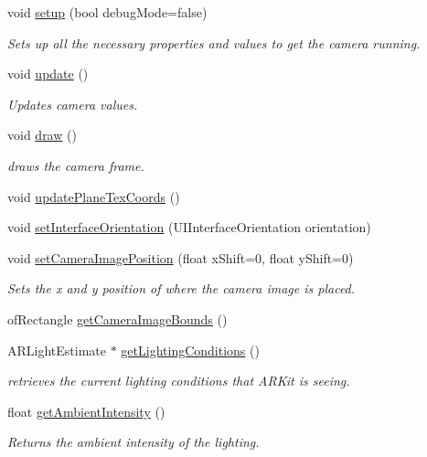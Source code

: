 \begin{DoxyCompactItemize}
void \hyperlink{class_a_r_core_1_1_a_r_cam_a5abe4cdd0ae36986899afaeae16c6bf2}{setup} (bool debug\+Mode=false)
\begin{DoxyCompactList}\small\item\em Sets up all the necessary properties and values to get the camera running. \end{DoxyCompactList}\item 
void \hyperlink{class_a_r_core_1_1_a_r_cam_a900296e2ff23dfa7deb8bfab58fd0729}{update} ()
\begin{DoxyCompactList}\small\item\em Updates camera values. \end{DoxyCompactList}\item 
void \hyperlink{class_a_r_core_1_1_a_r_cam_ac6506992ee88e0acd20d851849ebfa18}{draw} ()
\begin{DoxyCompactList}\small\item\em draws the camera frame. \end{DoxyCompactList}\item 
void \hyperlink{class_a_r_core_1_1_a_r_cam_a577095ff1d35c84708f578d07df5ac33}{update\+Plane\+Tex\+Coords} ()
\item 
void \hyperlink{class_a_r_core_1_1_a_r_cam_ab4af1b504437a61f5ecec331ad2bd52c}{set\+Interface\+Orientation} (U\+I\+Interface\+Orientation orientation)
\item 
void \hyperlink{class_a_r_core_1_1_a_r_cam_ae287390a140e20f856c44988f706efa5}{set\+Camera\+Image\+Position} (float x\+Shift=0, float y\+Shift=0)
\begin{DoxyCompactList}\small\item\em Sets the x and y position of where the camera image is placed. \end{DoxyCompactList}\item 
of\+Rectangle \hyperlink{class_a_r_core_1_1_a_r_cam_abd6a08f527d91cb750b03ef12a52afe5}{get\+Camera\+Image\+Bounds} ()
\item 
A\+R\+Light\+Estimate $\ast$ \hyperlink{class_a_r_core_1_1_a_r_cam_ad11f88524d97445892956def3864523e}{get\+Lighting\+Conditions} ()
\begin{DoxyCompactList}\small\item\em retrieves the current lighting conditions that A\+R\+Kit is seeing. \end{DoxyCompactList}\item 
float \hyperlink{class_a_r_core_1_1_a_r_cam_a98cb7f152cbc3028d258705da1591a55}{get\+Ambient\+Intensity} ()
\begin{DoxyCompactList}\small\item\em Returns the ambient intensity of the lighting. \end{DoxyCompactList}\item 

\end{DoxyCompactItemize}
